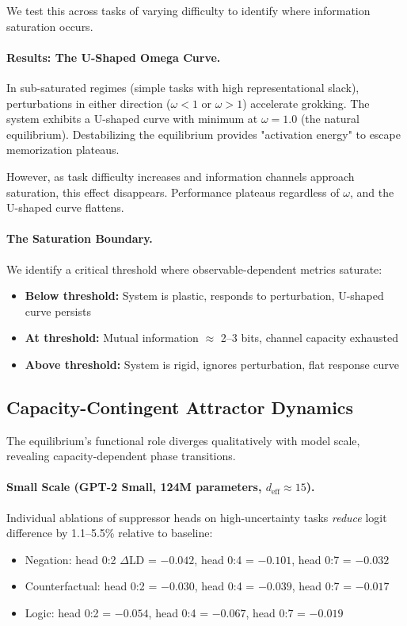 We test this across tasks of varying difficulty to identify where information saturation occurs.

\paragraph{Results: The U-Shaped Omega Curve.}
In sub-saturated regimes (simple tasks with high representational slack), perturbations in either direction ($\omega < 1$ or $\omega > 1$) accelerate grokking. The system exhibits a U-shaped curve with minimum at $\omega = 1.0$ (the natural equilibrium). Destabilizing the equilibrium provides "activation energy" to escape memorization plateaus.

However, as task difficulty increases and information channels approach saturation, this effect disappears. Performance plateaus regardless of $\omega$, and the U-shaped curve flattens.

\paragraph{The Saturation Boundary.}
We identify a critical threshold where observable-dependent metrics saturate:
\begin{itemize}
\item \textbf{Below threshold:} System is plastic, responds to perturbation, U-shaped curve persists
\item \textbf{At threshold:} Mutual information $\approx$ 2--3 bits, channel capacity exhausted
\item \textbf{Above threshold:} System is rigid, ignores perturbation, flat response curve
\end{itemize}

\subsection{Capacity-Contingent Attractor Dynamics}

The equilibrium's functional role diverges qualitatively with model scale, revealing capacity-dependent phase transitions.

\paragraph{Small Scale (GPT-2 Small, 124M parameters, $d_{\text{eff}} \approx 15$).}
Individual ablations of suppressor heads on high-uncertainty tasks \emph{reduce} logit difference by 1.1--5.5\% relative to baseline:
\begin{itemize}
\item Negation: head 0:2 $\Delta$LD = $-0.042$, head 0:4 = $-0.101$, head 0:7 = $-0.032$
\item Counterfactual: head 0:2 = $-0.030$, head 0:4 = $-0.039$, head 0:7 = $-0.017$
\item Logic: head 0:2 = $-0.054$, head 0:4 = $-0.067$, head 0:7 = $-0.019$
\end{itemize}

